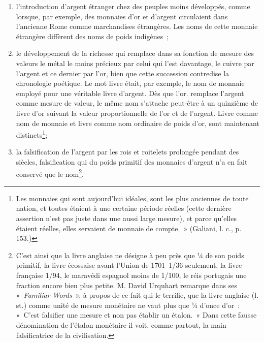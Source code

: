 \documentclass[french,twoside]{book} %
\begin{document}
\begin{enumerate}[itemsep=0pt,]
\item l’introduction d’argent étranger chez des peuples moins développés, comme lorsque, par exemple, des monnaies d’or et d’argent circulaient dans l’ancienne Rome comme marchandises étrangères. Les noms de cette monnaie étrangère diffèrent des noms de poids indigènes ;
\item le développement de la richesse qui remplace dans sa fonction de mesure des valeurs le métal le moins précieux par celui qui l’est davantage, le cuivre par l’argent et ce dernier par l’or, bien que cette succession contredise la chronologie poétique. Le mot livre était, par exemple, le nom de monnaie employé pour une véritable livre d’argent. Dès que l’or. remplace l’argent comme mesure de valeur, le même nom s’attache peut‑être à un quinzième de livre d’or suivant la valeur proportionnelle de l’or et de l’argent. Livre comme nom de monnaie et livre comme nom ordinaire de poids d’or, sont maintenant distincts\footnote{Les monnaies qui sont aujourd’hui idéales, sont les plus anciennes de toute nation, et toutes étaient à une certaine période réelles (cette dernière assertion n’est pas juste dans une aussi large mesure), et parce qu’elles étaient réelles, elles servaient de monnaie de compte. » (Galiani, l. c., p. 153.)};
\item la falsification de l’argent par les rois et roitelets prolongée pendant des siècles, falsification qui du poids primitif des monnaies d’argent n’a en fait conservé que le nom\footnote{C’est ainsi que la livre anglaise ne désigne à peu près que ¼ de son poids primitif, la livre écossaise avant l’Union de 1701 1/36 seulement, la livre française 1/94, le maravédi espagnol moins de 1/100, le réis portugais une fraction encore bien plus petite. M. David Urquhart remarque dans ses « \emph{Familiar Words} », à propos de ce fait qui le terrifie, que la livre anglaise (l. st.) comme unité de mesure monétaire ne vaut plus que ¼ d’once d’or : « C’est falsifier une mesure et non pas établir un étalon. » Dans cette fausse dénomination de l’étalon monétaire il voit, comme partout, la main falsificatrice de la civilisation.}.
\end{enumerate}
\end{document}
